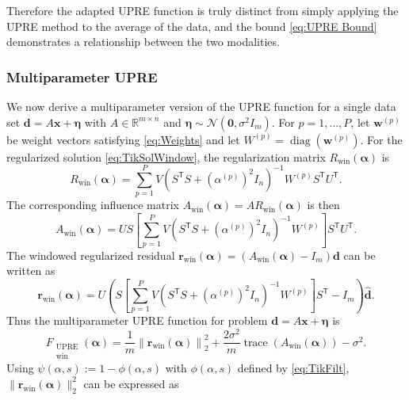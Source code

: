 \documentclass[12pt]{article}
\newcommand{\mA}{m}	%
\newcommand{\dVec}{\mathbf{d}}	%
\newcommand{\rVec}{\mathbf{r}}	%
\newcommand{\xVec}{\mathbf{x}}	%
\newcommand{\wVec}{\mathbf{w}}	%
\newcommand{\trans}[1]{{#1}^\mathsf{T}}	%
\newcommand{\inv}[1]{{#1}^{-1}}	%
\DeclareMathOperator{\trace}{trace}		%
\DeclareMathOperator{\diag}{diag}	%
\newcommand{\dft}[1]{\widehat{#1}}	%
\newcommand{\regparam}{\alpha}  %
\newcommand{\regparamVec}{\bm{\regparam}}   %
\newcommand{\filt}{\phi}
\newcommand{\mfilt}{\psi}
\newcommand{\noise}{\eta}	%
\newcommand{\noiseSD}{\sigma}	%
\newcommand{\noiseVec}{\bm{\noise}}	%
\newcommand{\zeroVec}{\bm{0}}	%
\newcommand{\singular}{s}	%
\newcommand{\UWin}{F_{\substack{\text{UPRE} \\ \text{win}}}}	%
\begin{document}
\noindent Therefore the adapted UPRE function is truly distinct from simply applying the UPRE method to the average of the data, and the bound \eqref{eq:UPRE Bound} demonstrates a relationship between the two modalities.

\subsubsection{Multiparameter UPRE}
We now derive a multiparameter version of the UPRE function for a single data set $\dVec = A\xVec + \noiseVec$ with $A \in \mathbb{R}^{\mA \times n}$ and $\noiseVec \sim \mathcal{N}(\zeroVec,\noiseSD^2 I_{\mA})$. For $p = 1,\ldots,P$, let $\wVec^{(p)}$ be weight vectors satisfying \eqref{eq:Weights} and let $W^{(p)} = \diag(\wVec^{(p)})$. For the regularized solution \eqref{eq:TikSolWindow}, the regularization matrix $R_\text{win}(\regparamVec)$ is
\begin{equation}
\label{eq:Windowed Reg Matrix}
    R_\text{win}(\regparamVec) = \sum_{p=1}^P V\inv{\left(\trans{S}S + \left(\regparam^{(p)}\right)^2 I_{n}\right)}W^{(p)}\trans{S}\trans{U}.
\end{equation}
The corresponding influence matrix $A_\text{win}(\regparamVec) = AR_\text{win}(\regparamVec)$ is then
\begin{equation}
\label{eq:Windowed Influence Matrix}
    A_\text{win}(\regparamVec) = US\left[\sum_{p=1}^P V\inv{\left(\trans{S}S + \left(\regparam^{(p)}\right)^2 I_n\right)}W^{(p)}\right]\trans{S}\trans{U}. 
\end{equation}
The windowed regularized residual $\rVec_\text{win}(\regparamVec) = (A_\text{win}(\regparamVec) - I_{\mA})\dVec$ can be written as
\begin{equation}
    \rVec_\text{win}(\regparamVec) = U\left(S\left[\sum_{p=1}^P V\inv{\left(\trans{S}S + \left(\regparam^{(p)}\right)^2 I_n\right)}W^{(p)}\right]\trans{S} - I_{\mA}\right)\dft{\dVec}.
\end{equation}
Thus the multiparameter UPRE function for problem $\dVec = A\xVec + \noiseVec$ is 
\begin{equation}
\label{eq:Multiparameter UPRE}
    \UWin(\regparamVec) = \frac{1}{\mA}\left\|\rVec_\text{win}(\regparamVec)\right\|_2^2 + \frac{2\noiseSD^2}{\mA}\trace\left(A_\text{win}(\regparamVec)\right) - \noiseSD^2.
\end{equation}
Using $\mfilt(\regparam,\singular) := 1 - \filt(\regparam,\singular)$ with $\filt(\regparam,\singular)$ defined by \eqref{eq:TikFilt}, $\|\rVec_\text{win}(\regparamVec)\|_2^2$ can be expressed as
\end{document}
